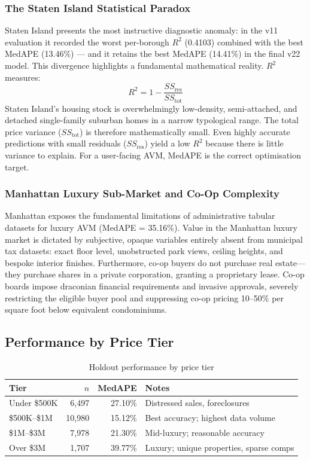 \documentclass[11pt, a4paper, twoside]{article}
\begin{document}
\subsubsection{The Staten Island Statistical Paradox}
Staten Island presents the most instructive diagnostic anomaly: in the v11
evaluation it recorded the worst per-borough $R^2$ (0.4103) combined with the
best MedAPE (13.46\%) --- and it retains the best MedAPE (14.41\%) in the
final v22 model. This divergence
highlights a fundamental mathematical reality. $R^2$ measures:
\begin{equation}
  R^2 = 1 - \frac{SS_\text{res}}{SS_\text{tot}}
\end{equation}
Staten Island's housing stock is overwhelmingly low-density, semi-attached,
and detached single-family suburban homes in a narrow typological range. The
total price variance ($SS_\text{tot}$) is therefore mathematically small.
Even highly accurate predictions with small residuals ($SS_\text{res}$) yield
a low $R^2$ because there is little variance to explain. For a user-facing AVM,
MedAPE is the correct optimisation target.

\subsubsection{Manhattan Luxury Sub-Market and Co-Op Complexity}
Manhattan exposes the fundamental limitations of administrative tabular datasets
for luxury AVM (MedAPE = 35.16\%). Value in the Manhattan luxury market is
dictated by subjective, opaque variables entirely absent from municipal tax
datasets: exact floor level, unobstructed park views, ceiling heights, and
bespoke interior finishes. Furthermore, co-op buyers do not purchase real
estate---they purchase shares in a private corporation, granting a proprietary
lease. Co-op boards impose draconian financial requirements and invasive
approvals, severely restricting the eligible buyer pool and suppressing co-op
pricing 10--50\% per square foot below equivalent condominiums.

\subsection{Performance by Price Tier}
\begin{table}[H]
  \centering
  \caption{Holdout performance by price tier}
  \label{tab:tier_perf}
  \begin{tabular}{lrrp{5cm}}
    \toprule
    Tier & $n$ & MedAPE & Notes \\
    \midrule
    Under \$500K  &  6,497 & 27.10\% & Distressed sales, foreclosures \\
    \$500K--\$1M  & 10,980 & 15.12\% & Best accuracy; highest data volume \\
    \$1M--\$3M    &  7,978 & 21.30\% & Mid-luxury; reasonable accuracy \\
    Over \$3M     &  1,707 & 39.77\% & Luxury; unique properties, sparse comps \\
    \bottomrule
  \end{tabular}
\end{table}
\end{document}
